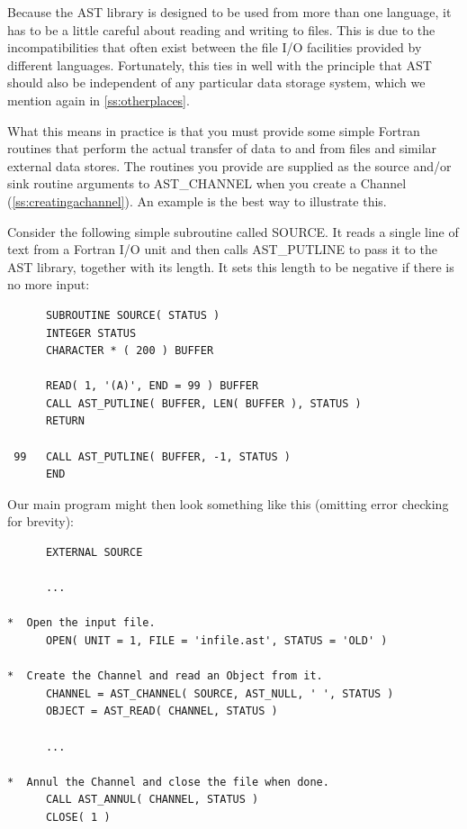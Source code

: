 \documentclass[twoside,11pt]{article}
\newcommand{\htmlref}[2]{#1}
\newcommand{\secref}[1]{\S\ref{#1}}
\renewcommand{\secref}[1]{\ref{#1}}
\begin{document}
Because the AST library is designed to be used from more than one
language, it has to be a little careful about reading and writing to
files. This is due to the incompatibilities that often exist between
the file I/O facilities provided by different languages.  Fortunately,
this ties in well with the principle that AST should also be
independent of any particular data storage system, which we mention
again in \secref{ss:otherplaces}.

What this means in practice is that you must provide some simple
Fortran routines that perform the actual transfer of data to and from
files and similar external data stores. The routines you provide are
supplied as the source and/or sink routine arguments to \htmlref{AST\_CHANNEL}{AST_CHANNEL}
when you create a Channel (\secref{ss:creatingachannel}). An example is
the best way to illustrate this.

Consider the following simple subroutine called SOURCE. It reads a
single line of text from a Fortran I/O unit and then calls
\htmlref{AST\_PUTLINE}{AST_PUTLINE} to pass it to the AST library, together with its
length. It sets this length to be negative if there is no more input:

\small
\begin{verbatim}
      SUBROUTINE SOURCE( STATUS )
      INTEGER STATUS
      CHARACTER * ( 200 ) BUFFER

      READ( 1, '(A)', END = 99 ) BUFFER
      CALL AST_PUTLINE( BUFFER, LEN( BUFFER ), STATUS )
      RETURN

 99   CALL AST_PUTLINE( BUFFER, -1, STATUS )      
      END
\end{verbatim}
\normalsize

Our main program might then look something like this (omitting error
checking for brevity):

\small
\begin{verbatim}
      EXTERNAL SOURCE

      ...

*  Open the input file.
      OPEN( UNIT = 1, FILE = 'infile.ast', STATUS = 'OLD' )

*  Create the Channel and read an Object from it.
      CHANNEL = AST_CHANNEL( SOURCE, AST_NULL, ' ', STATUS )
      OBJECT = AST_READ( CHANNEL, STATUS )

      ...

*  Annul the Channel and close the file when done.
      CALL AST_ANNUL( CHANNEL, STATUS )
      CLOSE( 1 )
\end{verbatim}
\normalsize
\end{document}
